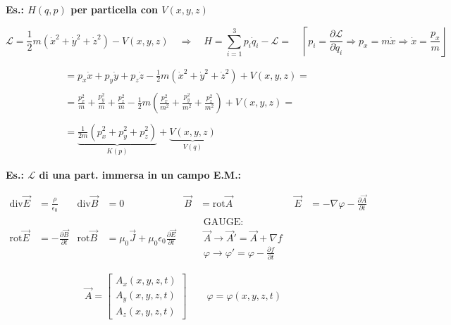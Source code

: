 \documentclass[12pt,a4paper]{article}
\begin{document}
\vspace{0.8cm}
\noindent \textbf{Es.: $H(q,p)$ per particella con $V(x,y,z)$}

\vspace{0.3cm}
\begin{equation*}
    \mathcal{L} = \frac{1}{2}m(\dot{x}^2 + \dot{y}^2 + \dot{z}^2) - V(x,y,z) \quad \Rightarrow \quad H = \sum_{i=1}^3 p_i \dot{q}_i - \mathcal{L} = \quad \left\lceil p_i = \frac{\partial \mathcal{L}}{\partial \dot{q}_i} \Rightarrow p_x = m\dot{x} \Rightarrow \dot{x} = \frac{p_x}{m} \right\rfloor
\end{equation*}

\begin{align*}
    &= p_x \dot{x} + p_y \dot{y} + p_z \dot{z} - \frac{1}{2}m(\dot{x}^2 + \dot{y}^2 + \dot{z}^2) + V(x,y,z) = \\
    \\
    &= \frac{p_x^2}{m} + \frac{p_y^2}{m} + \frac{p_z^2}{m} - \frac{1}{2}m\left( \frac{p_x^2}{m^2} + \frac{p_y^2}{m^2} + \frac{p_z^2}{m^2} \right) + V(x,y,z) = \\
    \\
    &= \underbrace{\frac{1}{2m} (p_x^2 + p_y^2 + p_z^2)}_{K(p)} + \underbrace{V(x,y,z)}_{V(q)}
\end{align*}

\vspace{0.8cm}
\noindent \textbf{Es.: $\mathcal{L}$ di una part. immersa in un campo E.M.:}

\begin{align*}
    \text{div} \vec{E} &= \frac{\rho}{\epsilon_0} & \text{div} \vec{B} &= 0 & \vec{B} &= \text{rot} \vec{A} & \vec{E} &= -\nabla \varphi - \frac{\partial \vec{A}}{\partial t} \\
    \text{rot} \vec{E} &= -\frac{\partial \vec{B}}{\partial t} & \text{rot} \vec{B} &= \mu_0 \vec{J} + \mu_0 \epsilon_0 \frac{\partial \vec{E}}{\partial t} & & \begin{matrix} \text{GAUGE:} \\ \vec{A} \rightarrow \vec{A}' = \vec{A} + \nabla f \\ \varphi \rightarrow \varphi' = \varphi - \frac{\partial f}{\partial t} \end{matrix}
\end{align*}

\begin{equation*}
    \vec{A} = \begin{bmatrix} A_x(x,y,z,t) \\ A_y(x,y,z,t) \\ A_z(x,y,z,t) \end{bmatrix} \qquad \varphi = \varphi(x,y,z,t)
\end{equation*}
\end{document}
